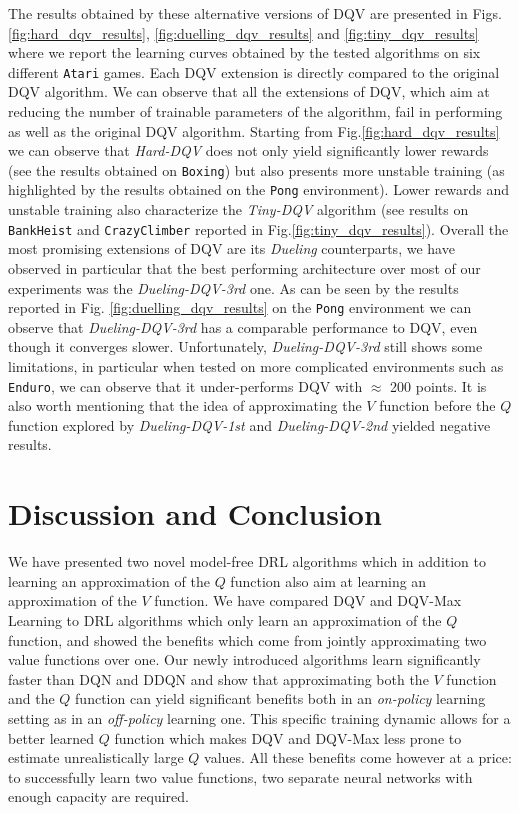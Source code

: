 The results obtained by these alternative versions of DQV are presented in Figs. \ref{fig:hard_dqv_results}, \ref{fig:duelling_dqv_results} and \ref{fig:tiny_dqv_results} where we report the learning curves obtained by the tested algorithms on six different \texttt{Atari} games. Each DQV extension is directly compared to the original DQV algorithm. We can observe that all the extensions of DQV, which aim at reducing the number of trainable parameters of the algorithm, fail in performing as well as the original DQV algorithm. Starting from Fig.\ref{fig:hard_dqv_results} we can observe that \textit{Hard-DQV} does not only yield significantly lower rewards (see the results obtained on \texttt{Boxing}) but also presents more unstable training (as highlighted by the results obtained on the \texttt{Pong} environment). Lower rewards and unstable training also characterize the \textit{Tiny-DQV} algorithm (see results on \texttt{BankHeist} and \texttt{CrazyClimber} reported in Fig.\ref{fig:tiny_dqv_results}). Overall the most promising extensions of DQV are its \textit{Dueling} counterparts, we have observed in particular that the best performing architecture over most of our experiments was the \textit{Dueling-DQV-3rd} one. As can be seen by the results reported in Fig. \ref{fig:duelling_dqv_results} on the \texttt{Pong} environment we can observe that \textit{Dueling-DQV-3rd} has a comparable performance to DQV, even though it converges slower. Unfortunately, \textit{Dueling-DQV-3rd} still shows some limitations, in particular when tested on more complicated environments such as \texttt{Enduro}, we can observe that it under-performs DQV with $\approx$ 200 points. It is also worth mentioning that the idea of approximating the $V$ function before the $Q$ function explored by \textit{Dueling-DQV-1st} and \textit{Dueling-DQV-2nd} yielded negative results.






\section{Discussion and Conclusion}
\label{sec:ijcnn_discussion}

We have presented two novel model-free DRL algorithms which in addition to learning an approximation of the $Q$ function also aim at learning an approximation of the $V$ function. We have compared DQV and DQV-Max Learning to DRL algorithms which only learn an approximation of the $Q$ function, and showed the benefits which come from jointly approximating two value functions over one. Our newly introduced algorithms learn significantly faster than DQN and DDQN and show that approximating both the $V$ function and the $Q$ function can yield significant benefits both in an \textit{on-policy} learning setting as in an \textit{off-policy} learning one. This specific training dynamic allows for a better learned $Q$ function which makes DQV and DQV-Max less prone to estimate unrealistically large $Q$ values. All these benefits come however at a price: to successfully learn two value functions, two separate neural networks with enough capacity are required. 

